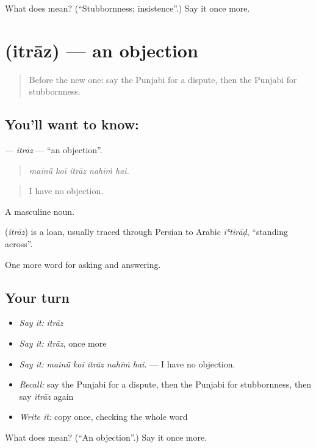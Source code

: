 \begin{tcolorbox}[breakable,colback=teal!4,colframe=teal!35!black,title={Before you move on}]
What does  mean? (\textquotedblleft{}Stubbornness; insistence\textquotedblright{}.) Say it once more.
\end{tcolorbox}
\section[\texorpdfstring{\pa{ਇਤਰਾਜ਼} (itrāz)}{ਇਤਰਾਜ਼ (itrāz)}]{ (itrāz) — an objection}

\label{lesson:PA-C344-itraz}



\begin{quote}
Before the new one: say the Punjabi for a dispute, then the Punjabi for stubbornness.
\end{quote}

\subsection*{You'll want to know: }
\textbf{} — \emph{itrāz} — \textquotedblleft{}an objection\textquotedblright{}.

\begin{quote}
    
\end{quote}

\begin{quote}
\emph{mainū̃ koī itrāz nahīṁ hai.}
\end{quote}

\begin{quote}
I have no objection.
\end{quote}

A masculine noun.

\begin{cousinweb}
\textbf{} (\emph{itrāz}) is a loan, usually traced through Persian to Arabic \emph{iʿtirāḍ}, \textquotedblleft{}standing across\textquotedblright{}.
\end{cousinweb}

\begin{grammarlens}[title={What you've built}]
One more word for asking and answering.
\end{grammarlens}

\subsection*{Your turn}
\begin{itemize}
\raggedright
  \item \emph{Say it:} \emph{itrāz}
  \item \emph{Say it:} \emph{itrāz}, once more
  \item \emph{Say it:} \emph{mainū̃ koī itrāz nahīṁ hai.} — I have no objection.
  \item \emph{Recall:} say the Punjabi for a dispute, then the Punjabi for stubbornness, then say \emph{itrāz} again
  \item \emph{Write it:} copy \textbf{} once, checking the whole word
\end{itemize}

\begin{tcolorbox}[breakable,colback=teal!4,colframe=teal!35!black,title={Before you move on}]
What does  mean? (\textquotedblleft{}An objection\textquotedblright{}.) Say it once more.
\end{tcolorbox}
